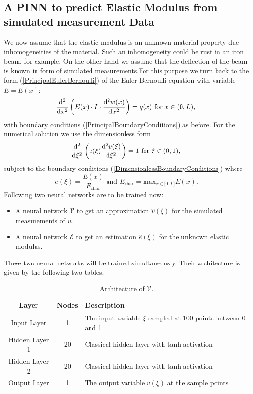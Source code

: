 \documentclass[a4paper,11pt]{article}
\begin{document}
\subsection*{A PINN to predict Elastic Modulus from simulated measurement Data}
We now assume that the elastic modulus is an unknown material property due inhomogeneities of the material. Such an inhomogeneity could be rust in an iron beam, for example. On the other hand we assume that the deflection of the beam is known in form of simulated measurements.For this purpose we turn back to the form (\ref{PrincipalEulerBernoulli}) of the Euler-Bernoulli equation with variable $E = E(x) $:
$$
\frac{\mathrm{d}^2}{\mathrm{d}x^2} \left( E(x)\cdot I \cdot \frac{\mathrm{d}^2 w(x)}{\mathrm{d}x^2} \right) = q(x) \text{ for } x \in (0,L),\\
$$
with boundary conditions (\ref{PrincipalBoundaryConditions}) as before. For the numerical solution we use the dimensionless form
\begin{equation} \label{DimensionlessEulerBernoulli}
\frac{\mathrm{d}^2}{\mathrm{d}\xi^2}\left( e(\xi ) \frac{\mathrm{d}^2 v(\xi)}{\mathrm{d}\xi^2} \right)  = 1 \text{ for } \xi \in (0,1),\\
\end{equation}
subject to the boundary conditions (\ref{DimensionlessBoundaryConditions}) where
\begin{equation*}
e(\xi ) = \frac{E( x ) }{E_{\mathrm{char}}}\text{ and } E_{\mathrm{char}} = \mathrm{max}_{x\in \lbrack 0, L \rbrack } E(x) .
\end{equation*}
Following \cite{teloli2024solving} two neural networks are to be trained now:
\begin{itemize}
\item
A neural network $\mathscr{V}$ to get an approximation $\hat{v} (\xi ) $ for the simulated measurements of $w$.
\item
A neural network $\mathscr{E}$ to get an estimation $\hat{e} (\xi) $ for the unknown elastic modulus.
\end{itemize}
These two neural networks will be trained simultaneously. Their architecture is given by the following two tables.
\begin{table}[h!]
\centering
\begin{tabular}{ccl}
\toprule
\textbf{Layer} & \textbf{Nodes} & \textbf{Description}\\
\midrule
Input Layer & 1 & The input variable $\xi $ sampled at 100 points between 0 and 1\\
Hidden Layer 1 & 20 & Classical hidden layer with tanh activation\\
Hidden Layer  2& 20 & Classical hidden layer with tanh activation\\
Output Layer & 1 & The output variable $v(\xi ) $ at the sample points\\
\bottomrule
\end{tabular}
\caption{Architecture of $\mathscr{V}$.}
\end{table}
\end{document}
